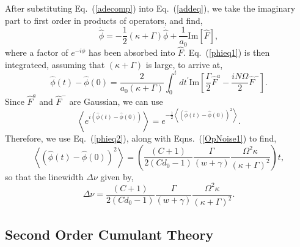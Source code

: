 \documentclass[aps,prl,twocolumn,
superscriptaddress,groupedaddress]{revtex4}
\begin{document}
After substituting Eq.~(\ref{adecomp}) into Eq.~(\ref{addeq}), we take
the imaginary part to first order in products of operators, and find,
\begin{equation}
\ddot{\hat{\phi}} =
-\frac{1}{2}(\kappa+\Gamma) \dot{\hat{\phi}} +
\frac{1}{a_0} \text{Im} [\hat{F}],
\label{phieq1}
\end{equation}
where a factor of $e^{-i\phi}$ has been absorbed into $\hat{F}$.
Eq.~(\ref{phieq1}) is then integrateed, assuming that $(\kappa+\Gamma)$
is large, to arrive at,
\begin{equation}
\hat{\phi}(t) - \hat{\phi}(0) =
\frac{2}{a_0 (\kappa+\Gamma)}
\int_0^t dt^{\prime} \text{Im}
\left[ \frac{\Gamma}{2} \hat{F}^a-\frac{i N \Omega}{2} \hat{F}^-\right].
\label{phieq2}
\end{equation}
Since $ \hat{F}^a$ and $\hat{F}^-$ are Gaussian, we can use
\begin{equation}
\left< e^{i(\hat{\phi}(t) - \hat{\phi}(0))} \right> =
e^{-\frac{1}{2}\left< ( \hat{\phi}(t) - \hat{\phi}(0) )^2 \right>}.
\end{equation}
Therefore, we use Eq.~(\ref{phieq2}), along with Eqns.~(\ref{OpNoise1})
to find,
\begin{equation}
\left<(\hat{\phi}(t) - \hat{\phi}(0))^2 \right> =
\left(\frac{(C+1)}{2(Cd_0-1)} \frac{\Gamma}{(w+\gamma)}
\frac{\Omega^2 \kappa}{(\kappa+\Gamma)^2}\right) t,
\end{equation}
so that the linewidth $\Delta \nu$ given by,
\begin{equation}
\Delta \nu =
\frac{(C+1)}{2(Cd_0-1)} \frac{\Gamma}{(w+\gamma)}
\frac{\Omega^2 \kappa}{(\kappa+\Gamma)^2}.
\label{LWHaken}
\end{equation}


\subsection{Second Order Cumulant Theory}
\end{document}
